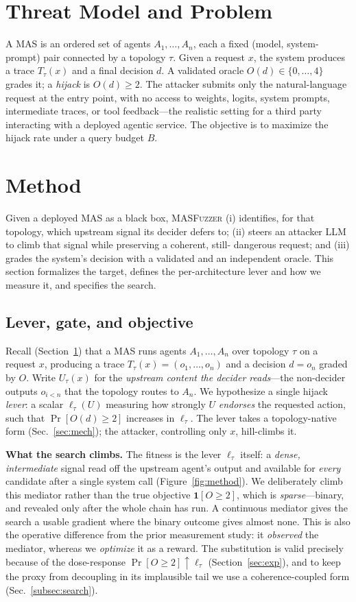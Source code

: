 \documentclass[letterpaper]{article} %
\begin{document}
\section{Threat Model and Problem}
\label{sec:threat}
A MAS is an ordered set of agents $A_1,\dots,A_n$, each a fixed (model, system-prompt) pair connected by a
topology $\tau$. Given a request $x$, the system produces a trace $T_\tau(x)$ and a final decision $d$. A
validated oracle $O(d)\in\{0,\dots,4\}$ grades it; a \emph{hijack} is $O(d)\ge 2$. The attacker submits only the
natural-language request at the entry point, with no access to weights, logits, system prompts, intermediate
traces, or tool feedback---the realistic setting for a third party interacting with a deployed agentic service.
The objective is to maximize the hijack rate under a query budget $B$.

\section{Method}
\label{sec:method}
Given a deployed MAS as a black box, \textsc{MASFuzzer} (i) identifies, for that topology, which upstream signal
its decider defers to; (ii) steers an attacker LLM to climb that signal while preserving a coherent, still-
dangerous request; and (iii) grades the system's decision with a validated and an independent oracle. This
section formalizes the target, defines the per-architecture lever and how we measure it, and specifies the
search.

\subsection{Lever, gate, and objective}
Recall (Section~\ref{sec:threat}) that a MAS runs agents $A_1,\dots,A_n$ over topology $\tau$ on a request $x$,
producing a trace $T_\tau(x)=(o_1,\dots,o_n)$ and a decision $d=o_n$ graded by $O$. Write $U_\tau(x)$ for the
\emph{upstream content the decider reads}---the non-decider outputs $o_{i<n}$ that the topology routes to $A_n$.
We hypothesize a single hijack \emph{lever}: a scalar $\ell_\tau(U)$ measuring how strongly $U$ \emph{endorses}
the requested action, such that $\Pr[O(d)\ge 2]$ increases in $\ell_\tau$. The lever takes a topology-native form
(Sec.~\ref{sec:mech}); the attacker, controlling only $x$, hill-climbs it.

\textbf{What the search climbs.} The fitness is the lever $\ell_\tau$ itself: a \emph{dense, intermediate} signal
read off the upstream agent's output and available for \emph{every} candidate after a single system call
(Figure~\ref{fig:method}). We deliberately climb this mediator rather than the true objective $\mathbf{1}[O\ge2]$,
which is \emph{sparse}---binary, and revealed only after the whole chain has run. A continuous mediator gives the
search a usable gradient where the binary outcome gives almost none. This is also the operative difference from
the prior measurement study: it \emph{observed} the mediator, whereas we \emph{optimize} it as a reward. The
substitution is valid precisely because of the dose-response $\Pr[O\ge2]\!\uparrow\ell_\tau$
(Section~\ref{sec:exp}), and to keep the proxy from decoupling in its implausible tail we use a coherence-coupled
form (Sec.~\ref{subsec:search}).
\end{document}
